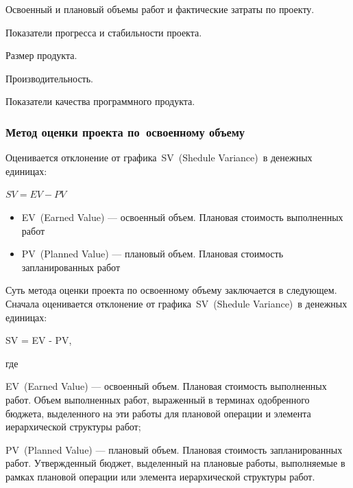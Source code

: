 \documentclass{../industrial-development}
\begin{document}
    Освоенный и плановый объемы работ и фактические затраты по проекту.

    Показатели прогресса и стабильности проекта.

    Размер продукта.

    Производительность.

    Показатели качества программного продукта.
    
    \begin{frame} \frametitle{Метод оценки проекта по~освоенному объему}
        Оценивается отклонение от графика \alert{SV} (Shedule Variance) в денежных единицах:
        \begin{center}
            $SV = EV - PV$
        \end{center}
        \begin{itemize}
            \item \alert{EV} (Earned Value) — освоенный объем. Плановая стоимость выполненных работ
            \item \alert{PV} (Planned Value) — плановый объем. Плановая стоимость запланированных работ
        \end{itemize}
    \end{frame}
    \lecturenotes
Суть метода оценки проекта по освоенному объему заключается в следующем. Сначала оценивается отклонение от графика SV (Shedule Variance) в денежных единицах:

SV = EV - PV,

где

EV (Earned Value) — освоенный объем. Плановая стоимость выполненных работ. Объем выполненных работ, выраженный в терминах одобренного бюджета, выделенного на эти работы для плановой операции и элемента иерархической структуры работ;

PV (Planned Value) — плановый объем. Плановая стоимость запланированных работ. Утвержденный бюджет, выделенный на плановые работы, выполняемые в рамках плановой операции или элемента иерархической структуры работ.
\end{document}
